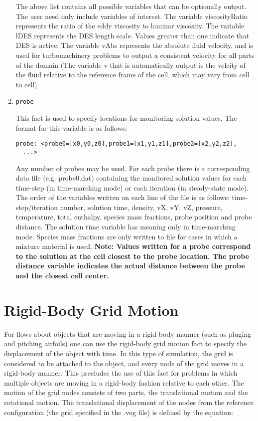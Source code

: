 \documentclass{article}
\begin{document}
\begin{enumerate}
The above list contains all possible variables that can be optionally output.
The user need only include variables of interest. The variable viscosityRatio
represents the ratio of the eddy viscosity to laminar viscosity. The variable
lDES represents the DES length scale. Values greater than one indicate that DES is
active. The variable vAbs represents the absolute fluid velocity, and is used
for turbomachinery problems to output a consistent velocity for all parts of
the domain (The variable v that is automatically output is the velcity of the
fluid relative to the reference frame of the cell, which may vary from cell to
cell).

\item{\tt probe}

This fact is used to specify locations for monitoring solution values. The
format for this variable is as follows:
\begin{verbatim}
probe: <probe0=[x0,y0,z0],probe1=[x1,y1,z1],probe2=[x2,y2,z2],
  ...>
\end{verbatim}

Any number of probes may be used. For
each probe there is a corresponding data file (e.g. probe0.dat) containing the
monitored solution values for each time-step (in time-marching mode) or each
iteration (in steady-state mode). The order of the variables written on each
line of the file is as follows: time-step/iteration number, solution time,
density, vX, vY, vZ, pressure, temperature, total enthalpy, species mass
fractions, probe position and probe distance. The solution time variable has
meaning only in time-marching mode. Species mass fractions are only written to
file for cases in which a mixture material is used. \bf Note: Values written
for a probe correspond to the solution at the cell closest to the probe
location. The probe distance variable indicates the actual distance between
the probe and the closest cell center.

\end{enumerate}

\appendix

\section{Rigid-Body Grid Motion} \label{appendix:rigidBody}

For flows about objects that are moving in a rigid-body manner (such as pluging
and pitching airfoils) one can use the rigid-body grid motion fact to specify
the displacement of the object with time. In this type of simulation, the grid
is considered to be attached to the object, and every node of the grid moves in
a rigid-body manner. This precludes the use of this fact for problems in which
multiple objects are moving in a rigid-body fashion relative to each other. The
motion of the grid nodes consists of two parts, the translational motion and the
rotational motion. The translational displacement of the nodes from the
reference configuration (the grid specified in the .vog file) is defined by
the equation:
\end{document}
